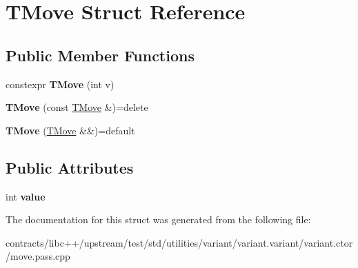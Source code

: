 \hypertarget{struct_t_move}{}\section{T\+Move Struct Reference}
\label{struct_t_move}
\subsection*{Public Member Functions}
\begin{DoxyCompactItemize}
\item 
\mbox{\label{struct_t_move_abc2e7b805f5c2e4094f8e171c32cecaf}} 
constexpr {\bfseries T\+Move} (int v)
\item 
\mbox{\label{struct_t_move_a98b81732ea7db2608fe49d341d086ccd}} 
{\bfseries T\+Move} (const \mbox{\hyperlink{struct_t_move}{T\+Move}} \&)=delete
\item 
\mbox{\label{struct_t_move_aa80b1b793fe8f004d422755cdb8c5eac}} 
{\bfseries T\+Move} (\mbox{\hyperlink{struct_t_move}{T\+Move}} \&\&)=default
\end{DoxyCompactItemize}
\subsection*{Public Attributes}
\begin{DoxyCompactItemize}
\item 
\mbox{\label{struct_t_move_acff73344d26845bd8e1ab167c65c4a27}} 
int {\bfseries value}
\end{DoxyCompactItemize}


The documentation for this struct was generated from the following file\+:\begin{DoxyCompactItemize}
\item 
contracts/libc++/upstream/test/std/utilities/variant/variant.\+variant/variant.\+ctor/move.\+pass.\+cpp\end{DoxyCompactItemize}
